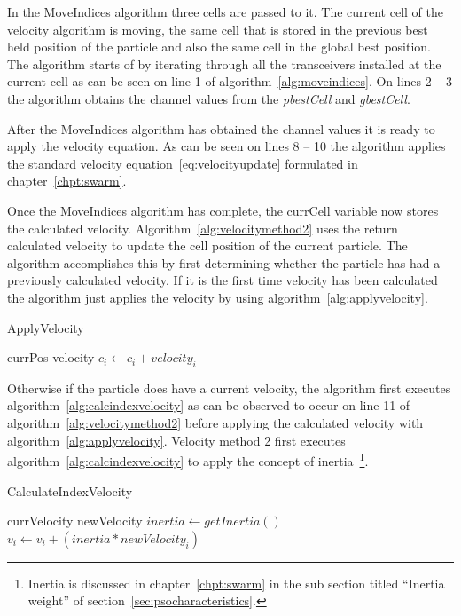 In the MoveIndices algorithm three cells are passed to it. The current cell of the velocity algorithm is moving, the same cell that is stored in the previous best held position of the particle and also the same cell in the global best position. The algorithm starts of by iterating through all the transceivers installed at the current cell as can be seen on line 1 of algorithm~\ref{alg:moveindices}. On lines 2 -- 3 the algorithm obtains the channel values from the \emph{pbestCell} and \emph{gbestCell}.

After the MoveIndices algorithm has obtained the channel values it is ready to apply the velocity equation. As can be seen on lines 8 -- 10 the algorithm applies the standard velocity equation~\ref{eq:velocityupdate} formulated in chapter~\ref{chpt:swarm}. 

Once the MoveIndices algorithm has complete, the currCell variable now stores the calculated velocity. Algorithm~\ref{alg:velocitymethod2} uses the return calculated velocity to update the cell position of the current particle. The algorithm accomplishes this by first determining whether the particle has had a previously calculated velocity. If it is the first time velocity has been calculated the algorithm just applies the velocity by using algorithm~\ref{alg:applyvelocity}. 

\begin{algorithm}
\caption{ApplyVelocity}
\label{alg:applyvelocity}
\begin{algorithmic}[1]
	\REQUIRE currPos
	\REQUIRE velocity
		\STATE $c_i \leftarrow c_i + velocity_i$
	\ENDFOR
\end{algorithmic}
\end{algorithm}

Otherwise if the particle does have a current velocity, the algorithm first executes algorithm~\ref{alg:calcindexvelocity} as can be observed to occur on line 11 of algorithm~\ref{alg:velocitymethod2} before applying the calculated velocity with algorithm~\ref{alg:applyvelocity}. Velocity method 2 first executes algorithm~\ref{alg:calcindexvelocity} to apply the concept of inertia~\footnote{Inertia is discussed in chapter~\ref{chpt:swarm} in the sub section titled ``Inertia weight'' of section~\ref{sec:psocharacteristics}.}.

\begin{algorithm}
\caption{CalculateIndexVelocity}
\label{alg:calcindexvelocity}
\begin{algorithmic}[1]
	\REQUIRE currVelocity
	\REQUIRE newVelocity
		\STATE $inertia \leftarrow getInertia()$
		\STATE $v_i \leftarrow v_i + (inertia * newVelocity_i)$
	\ENDFOR
\end{algorithmic}
\end{algorithm}

